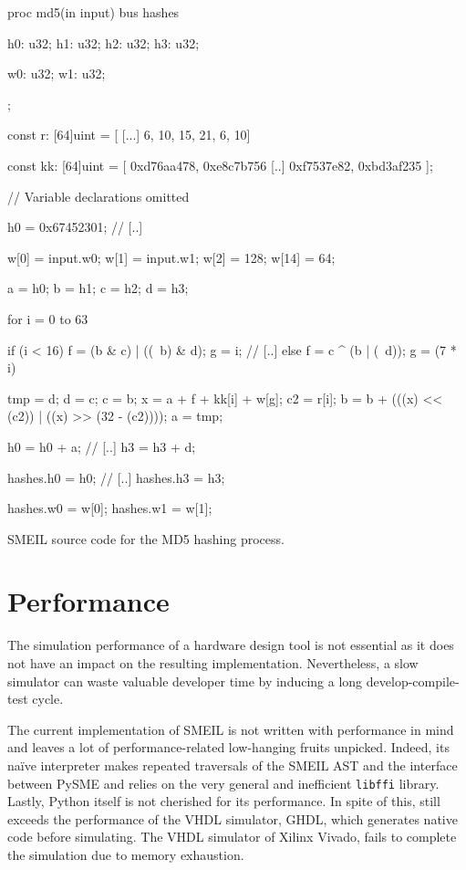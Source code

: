 
\begin{widefigure}

\begin{smeilcode2}
proc md5(in input)
  bus hashes {
    h0: u32;
    h1: u32;
    h2: u32;
    h3: u32;

    w0: u32;
    w1: u32;
  };

  const r: [64]uint = [
    [...]
    6, 10, 15, 21, 6, 10]

  const kk: [64]uint = [
    0xd76aa478, 0xe8c7b756
    [..]
    0xf7537e82, 0xbd3af235
    ];

// Variable declarations omitted

{
  h0 = 0x67452301;
  // [..]

  w[0] = input.w0;
  w[1] = input.w1;
  w[2] = 128;
  w[14] = 64;

  a = h0;
  b = h1;
  c = h2;
  d = h3;

for i = 0 to 63 {
  if (i < 16) {
    f = (b & c) | ((~b) & d);
    g = i;
   // [..]
  } else {
    f = c ^ (b | (~d));
    g = (7 * i) %
  }

  tmp = d;
  d = c;
  c = b;
  x = a + f + kk[i] + w[g];
  c2 = r[i];
  b = b + (((x) << (c2)) |
      ((x) >> (32 - (c2))));
  a = tmp;
}

h0 = h0 + a;
// [..]
h3 = h3 + d;

hashes.h0 = h0;
// [..]
hashes.h3 = h3;

hashes.w0 = w[0];
hashes.w1 = w[1];
}

\end{smeilcode2}
  \caption{SMEIL source code for the MD5 hashing process.}
  \label{fig:smeilhash}

\end{widefigure}

\section{Performance}
\label{sec:perf}
The simulation performance of a hardware design tool is not essential as it does
not have an impact on the resulting implementation. Nevertheless, a slow
simulator can waste valuable developer time by inducing a long
develop-compile-test cycle.

The current implementation of SMEIL is not written with performance in mind and
leaves a lot of performance-related low-hanging fruits unpicked. Indeed, its
naïve interpreter makes repeated traversals of the SMEIL AST and the interface
between PySME and \libsme{} relies on the very general and inefficient
\texttt{libffi} library.
Lastly, Python itself is not cherished for its performance. In spite of this,
\libsme{} still exceeds the performance of the VHDL simulator, GHDL, which
generates native code before simulating. The VHDL simulator of Xilinx Vivado,
fails to complete the simulation due to memory exhaustion.

